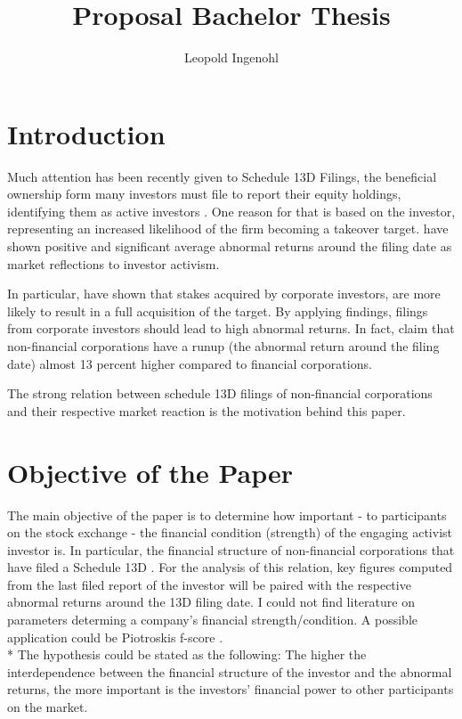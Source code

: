 \documentclass[12pt]{article}
\title{Proposal Bachelor Thesis}
\author{Leopold Ingenohl}
\begin{document}
\maketitle

\section{Introduction}
Much attention has been recently given to Schedule 13D Filings, the beneficial ownership form many investors must file to report their equity holdings, identifying them as active investors \citet{Giglia2018}. One reason for that is based on the investor, representing an increased likelihood of the firm becoming a takeover target\citep{Brigida2012}. \citet{Brav2008} have shown positive and significant average abnormal returns around the filing date as market reflections to investor activism.

In particular, \citet{Akhigbe2007} have shown that stakes acquired by corporate investors, are more likely to result in a full acquisition of the target. By applying \citep{Brav2008} findings, filings from corporate investors should lead to high abnormal returns. In fact, \citet{Brigida2012}claim that non-financial corporations have a runup (the abnormal return around the filing date) almost 13 percent higher compared to financial corporations.

The strong relation between schedule 13D filings of non-financial corporations and their respective market reaction is the motivation behind this paper.


\section{Objective of the Paper}
The main objective of the paper is to determine how important - to participants on the stock exchange - the financial condition (strength) of the engaging activist investor is. In particular, the financial structure of non-financial corporations that have filed a Schedule 13D \citep{Bell2017}. 
For the analysis of this relation, key figures computed from the last filed report of the investor will be paired with the respective abnormal returns around the 13D filing date. I could not find literature on parameters determing a company's financial strength/condition. A possible application could be Piotroskis f-score \citep{Piotroski2000}.\\*
The hypothesis could be stated as the following: The higher the interdependence between the financial structure of the investor and the abnormal returns, the more important is the investors' financial power to other participants on the market.
\pagebreak
\end{document}
